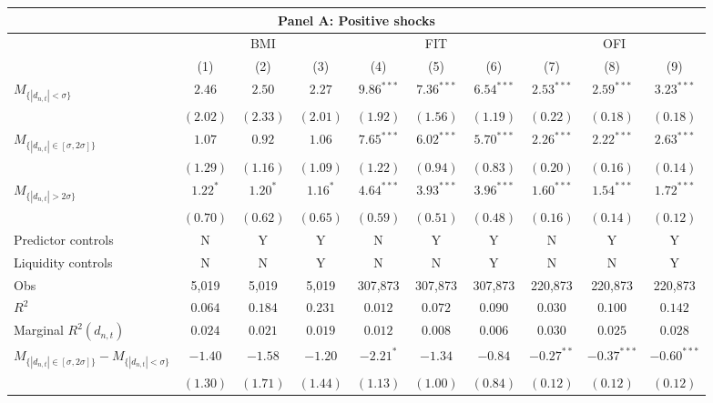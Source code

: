 \begin{tabular}{lccccccccc}
  \hline \multicolumn{10}{c}{Panel A: Positive shocks} \\
 \hline
  & \multicolumn{3}{c}{BMI} & \multicolumn{3}{c}{FIT} & \multicolumn{3}{c}{OFI} \\ 
  \cmidrule(l){2-4} \cmidrule(l){5-7} \cmidrule(l){8-10} 
  & (1) & (2) & (3) & (4) & (5) & (6) & (7) & (8) & (9) \\ 
  $M_{\{|d_{n,t}| < \sigma\}}$ & $2.46$ & $2.50$ & $2.27$ & $9.86^{***}$ & $7.36^{***}$ & $6.54^{***}$ & $2.53^{***}$ & $2.59^{***}$ & $3.23^{***}$ \\ 
   & $(2.02)$ & $(2.33)$ & $(2.01)$ & $(1.92)$ & $(1.56)$ & $(1.19)$ & $(0.22)$ & $(0.18)$ & $(0.18)$ \\ 
  $M_{\{|d_{n,t}| \in [\sigma, 2\sigma]\}}$ & $1.07$ & $0.92$ & $1.06$ & $7.65^{***}$ & $6.02^{***}$ & $5.70^{***}$ & $2.26^{***}$ & $2.22^{***}$ & $2.63^{***}$ \\ 
   & $(1.29)$ & $(1.16)$ & $(1.09)$ & $(1.22)$ & $(0.94)$ & $(0.83)$ & $(0.20)$ & $(0.16)$ & $(0.14)$ \\ 
  $M_{\{|d_{n,t}| > 2 \sigma\}}$ & $1.22^{*}$ & $1.20^{*}$ & $1.16^{*}$ & $4.64^{***}$ & $3.93^{***}$ & $3.96^{***}$ & $1.60^{***}$ & $1.54^{***}$ & $1.72^{***}$ \\ 
   & $(0.70)$ & $(0.62)$ & $(0.65)$ & $(0.59)$ & $(0.51)$ & $(0.48)$ & $(0.16)$ & $(0.14)$ & $(0.12)$ \\ \vspace{5pt} 
  Predictor controls & N & Y & Y & N & Y & Y & N & Y & Y \\ 
  Liquidity controls & N & N & Y & N & N & Y & N & N & Y \\ \vspace{5pt} 
  Obs & 5,019 & 5,019 & 5,019 & 307,873 & 307,873 & 307,873 & 220,873 & 220,873 & 220,873 \\ 
  $R^2$ & $0.064$ & $0.184$ & $0.231$ & $0.012$ & $0.072$ & $0.090$ & $0.030$ & $0.100$ & $0.142$ \\ 
  Marginal $R^2(d_{n,t})$ & $0.024$ & $0.021$ & $0.019$ & $0.012$ & $0.008$ & $0.006$ & $0.030$ & $0.025$ & $0.028$ \\ 
 \hline
  $M_{\{|d_{n,t}| \in [\sigma, 2\sigma]\}} - M_{\{|d_{n,t}| < \sigma\}}$ & $-1.40$ & $-1.58$ & $-1.20$ & $-2.21^{*}$ & $-1.34$ & $-0.84$ & $-0.27^{**}$ & $-0.37^{***}$ & $-0.60^{***}$ \\ 
   & $(1.30)$ & $(1.71)$ & $(1.44)$ & $(1.13)$ & $(1.00)$ & $(0.84)$ & $(0.12)$ & $(0.12)$ & $(0.12)$ \\ 

\end{tabular}
